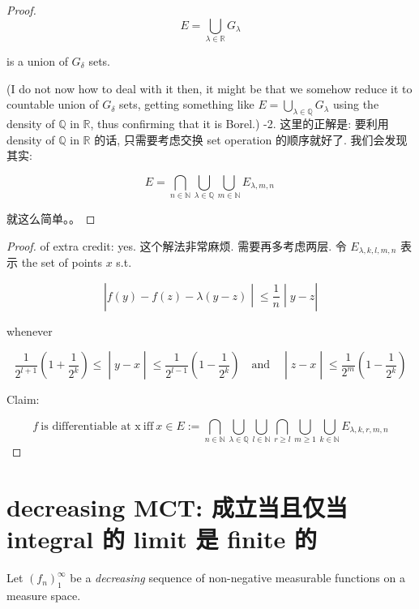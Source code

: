 \begin{proof}
\[E = \bigcup\limits_{\lambda \in \mathbb{R}}G_{\lambda}\]

is a union of \(G_{\delta}\) sets.

(I do not now how to deal with it then, it might be that we somehow reduce it to countable union of \(G_{\delta}\) sets, getting something like \(E = \bigcup_{\lambda \in \mathbb{Q}}G_{\lambda}\) using the density of \(\mathbb{Q}\) in \(\mathbb{R}\), thus confirming that it is Borel.) -2. 这里的正解是: 要利用 density of \(\mathbb{Q}\) in \(\mathbb{R}\) 的话, 只需要考虑交换 set operation 的顺序就好了. 我们会发现其实:

\[E = \bigcap\limits_{n \in \mathbb{N}}\bigcup\limits_{\lambda \in \mathbb{Q}}\bigcup\limits_{m \in \mathbb{N}}E_{\lambda,m,n}\,\]

就这么简单。。

\end{proof}

\begin{proof}

of extra credit: yes. 这个解法非常麻烦. 需要再多考虑两层. 令 \(E_{\lambda,k,l,m,n}\) 表示 the set of points \(x\) s.t.

\[\left. |f(y) - f(z) - \lambda(y - z) \middle| \leq \frac{1}{n} \middle| y - z| \right.\]

whenever

\[\left. \frac{1}{2^{l + 1}}(1 + \frac{1}{2^{k}}) \leq \middle| y - x \middle| \leq \frac{1}{2^{l - 1}}(1 - \frac{1}{2^{k}})\quad\text{and}\quad \middle| z - x \middle| \leq \frac{1}{2^{m}}(1 - \frac{1}{2^{k}}) \right.\]

Claim:

\[f\ \text{is differentiable at x}\ \text{iff}\ x \in E := \bigcap\limits_{n \in \mathbb{N}}\bigcup\limits_{\lambda \in \mathbb{Q}}\bigcup\limits_{l \in \mathbb{N}}\bigcap\limits_{r \geq l}\bigcup\limits_{m \geq 1}\bigcup\limits_{k \in \mathbb{N}}E_{\lambda,k,r,m,n}\]

\end{proof}

\section{decreasing MCT: 成立当且仅当 integral 的 limit 是 finite 的}\label{decreasing-mct-ux6210ux7acbux5f53ux4e14ux4ec5ux5f53-integral-ux7684-limit-ux662f-finite-ux7684}

Let \((f_{n})_{1}^{\infty}\) be a \emph{decreasing} sequence of non-negative measurable functions on a measure space.

